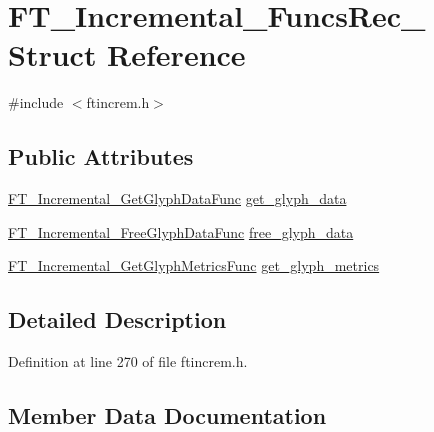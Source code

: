 \hypertarget{struct_f_t___incremental___funcs_rec__}{}\section{F\+T\+\_\+\+Incremental\+\_\+\+Funcs\+Rec\+\_\+ Struct Reference}
\label{struct_f_t___incremental___funcs_rec__}


{\ttfamily \#include $<$ftincrem.\+h$>$}

\subsection*{Public Attributes}
\begin{DoxyCompactItemize}
\item 
\mbox{\hyperlink{ftincrem_8h_ac6b537b5cb4b97b05cae225e24e85720}{F\+T\+\_\+\+Incremental\+\_\+\+Get\+Glyph\+Data\+Func}} \mbox{\hyperlink{struct_f_t___incremental___funcs_rec___ac276b7ff9624b8d8bf144ab8d00538b4}{get\+\_\+glyph\+\_\+data}}
\item 
\mbox{\hyperlink{ftincrem_8h_a80ee63b054c3ca6ca7cf280071853bd6}{F\+T\+\_\+\+Incremental\+\_\+\+Free\+Glyph\+Data\+Func}} \mbox{\hyperlink{struct_f_t___incremental___funcs_rec___a9201afcfda8c15be839aee04306dff0a}{free\+\_\+glyph\+\_\+data}}
\item 
\mbox{\hyperlink{ftincrem_8h_a3bd123a916bc132ec44104eab2e52a3f}{F\+T\+\_\+\+Incremental\+\_\+\+Get\+Glyph\+Metrics\+Func}} \mbox{\hyperlink{struct_f_t___incremental___funcs_rec___ac7d95e85357ab9d1893660b0628c1908}{get\+\_\+glyph\+\_\+metrics}}
\end{DoxyCompactItemize}


\subsection{Detailed Description}


Definition at line 270 of file ftincrem.\+h.



\subsection{Member Data Documentation}
\mbox{\label{struct_f_t___incremental___funcs_rec___a9201afcfda8c15be839aee04306dff0a}} 
